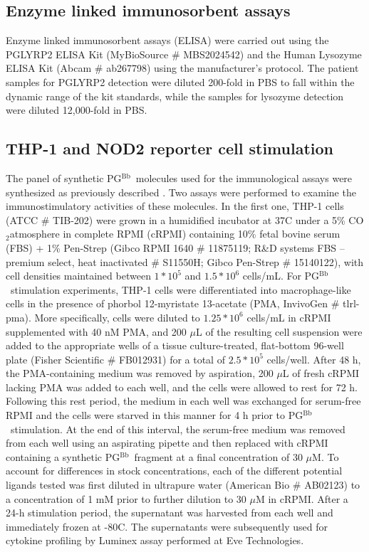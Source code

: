 \documentclass[twoside, watermark]{zHenriquesLab-StyleBioRxiv}
\newcommand{\tmu}{$\mu$} %
\newcommand{\COtwo}{CO$_\text{2}$} %
\newcommand{\pgbb}{PG$^\text{Bb}$}
\begin{document}
\subsection*{Enzyme linked immunosorbent assays}
Enzyme linked immunosorbent assays (ELISA) were carried out using the PGLYRP2 ELISA Kit (MyBioSource \# MBS2024542) and the Human Lysozyme ELISA Kit (Abcam \# ab267798) using the manufacturer’s protocol. The patient samples for PGLYRP2 detection were diluted 200-fold in PBS to fall within the dynamic range of the kit standards, while the samples for lysozyme detection were diluted 12,000-fold in PBS.

\subsection*{THP-1 and NOD2 reporter cell stimulation}
The panel of synthetic \pgbb~molecules used for the immunological assays were synthesized as previously described \cite{Putnik2024}. Two assays were performed to examine the immunostimulatory activities of these molecules. In the first one, THP-1 cells (ATCC \# TIB-202) were grown in a humidified incubator at 37\degree C under a 5\% \COtwo atmosphere in complete RPMI (cRPMI) containing 10\% fetal bovine serum (FBS) + 1\% Pen-Strep (Gibco RPMI 1640 \# 11875119; R\&D systems FBS – premium select, heat inactivated \# S11550H; Gibco Pen-Strep \# 15140122), with cell densities maintained between $1 * 10^5$ and $1.5 * 10^6$ cells/mL. For \pgbb~stimulation experiments, THP-1 cells were differentiated into macrophage-like cells in the presence of phorbol 12-myristate 13-acetate (PMA, InvivoGen \# tlrl-pma). More specifically, cells were diluted to $1.25 * 10^6$ cells/mL in cRPMI supplemented with 40 nM PMA, and 200 \tmu L of the resulting cell suspension were added to the appropriate wells of a tissue culture-treated, flat-bottom 96-well plate (Fisher Scientific \# FB012931) for a total of $2.5 * 10^5$ cells/well. After 48 h, the PMA-containing medium was removed by aspiration, 200 \tmu L of fresh cRPMI lacking PMA was added to each well, and the cells were allowed to rest for 72 h. Following this rest period, the medium in each well was exchanged for serum-free RPMI and the cells were starved in this manner for 4 h prior to \pgbb~stimulation. At the end of this interval, the serum-free medium was removed from each well using an aspirating pipette and then replaced with cRPMI containing a synthetic \pgbb~fragment at a final concentration of 30 \tmu M. To account for differences in stock concentrations, each of the different potential ligands tested was first diluted in ultrapure water (American Bio \# AB02123) to a concentration of 1 mM prior to further dilution to 30 \tmu M in cRPMI. After a 24-h stimulation period, the supernatant was harvested from each well and immediately frozen at -80\degree C. The supernatants were subsequently used for cytokine profiling by Luminex assay performed at Eve Technologies.
\end{document}
